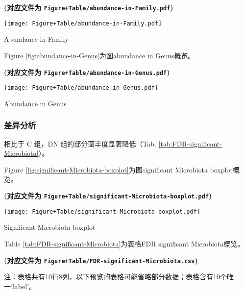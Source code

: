 \documentclass[
]{article}
\begin{document}
\textbf{(对应文件为 \texttt{Figure+Table/abundance-in-Family.pdf})}

\def\@captype{figure}
\begin{center}
\texttt{[image: Figure+Table/abundance-in-Family.pdf]}
\caption{Abundance in Family}\label{fig:abundance-in-Family}
\end{center}

Figure \ref{fig:abundance-in-Genus}为图abundance in Genus概览。

\textbf{(对应文件为 \texttt{Figure+Table/abundance-in-Genus.pdf})}

\def\@captype{figure}
\begin{center}
\texttt{[image: Figure+Table/abundance-in-Genus.pdf]}
\caption{Abundance in Genus}\label{fig:abundance-in-Genus}
\end{center}

\hypertarget{ux5deeux5f02ux5206ux6790}{%
\subsubsection{差异分析}\label{ux5deeux5f02ux5206ux6790}}

相比于 C 组，DN 组的部分菌丰度显著降低（Tab. \ref{tab:FDR-significant-Microbiota}）。

Figure \ref{fig:significant-Microbiota-boxplot}为图significant Microbiota boxplot概览。

\textbf{(对应文件为 \texttt{Figure+Table/significant-Microbiota-boxplot.pdf})}

\def\@captype{figure}
\begin{center}
\texttt{[image: Figure+Table/significant-Microbiota-boxplot.pdf]}
\caption{Significant Microbiota boxplot}\label{fig:significant-Microbiota-boxplot}
\end{center}

Table \ref{tab:FDR-significant-Microbiota}为表格FDR significant Microbiota概览。

\textbf{(对应文件为 \texttt{Figure+Table/FDR-significant-Microbiota.csv})}

\begin{center}\begin{tcolorbox}[colback=gray!10, colframe=gray!50, width=0.9\linewidth, arc=1mm, boxrule=0.5pt]注：表格共有10行8列，以下预览的表格可能省略部分数据；表格含有10个唯一`label'。
\end{tcolorbox}
\end{center}
\end{document}
